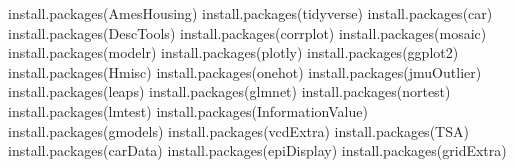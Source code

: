 \documentclass[
  letterpaper,
  DIV=11,
  numbers=noendperiod]{scrreprt}
\newenvironment{Shaded}{\begin{snugshade}}{\end{snugshade}}
\newcommand{\FunctionTok}[1]{\textcolor[rgb]{0.28,0.35,0.67}{#1}}
\newcommand{\NormalTok}[1]{\textcolor[rgb]{0.00,0.23,0.31}{#1}}
\newcommand{\StringTok}[1]{\textcolor[rgb]{0.13,0.47,0.30}{#1}}
\begin{document}
\begin{Shaded}
\begin{Highlighting}[]
\FunctionTok{install.packages}\NormalTok{(}\StringTok{\textquotesingle{}AmesHousing\textquotesingle{}}\NormalTok{)}
\FunctionTok{install.packages}\NormalTok{(}\StringTok{\textquotesingle{}tidyverse\textquotesingle{}}\NormalTok{)}
\FunctionTok{install.packages}\NormalTok{(}\StringTok{\textquotesingle{}car\textquotesingle{}}\NormalTok{)}
\FunctionTok{install.packages}\NormalTok{(}\StringTok{\textquotesingle{}DescTools\textquotesingle{}}\NormalTok{)}
\FunctionTok{install.packages}\NormalTok{(}\StringTok{\textquotesingle{}corrplot\textquotesingle{}}\NormalTok{)}
\FunctionTok{install.packages}\NormalTok{(}\StringTok{\textquotesingle{}mosaic\textquotesingle{}}\NormalTok{)}
\FunctionTok{install.packages}\NormalTok{(}\StringTok{\textquotesingle{}modelr\textquotesingle{}}\NormalTok{)}
\FunctionTok{install.packages}\NormalTok{(}\StringTok{\textquotesingle{}plotly\textquotesingle{}}\NormalTok{)}
\FunctionTok{install.packages}\NormalTok{(}\StringTok{\textquotesingle{}ggplot2\textquotesingle{}}\NormalTok{)}
\FunctionTok{install.packages}\NormalTok{(}\StringTok{\textquotesingle{}Hmisc\textquotesingle{}}\NormalTok{)}
\FunctionTok{install.packages}\NormalTok{(}\StringTok{\textquotesingle{}onehot\textquotesingle{}}\NormalTok{)}
\FunctionTok{install.packages}\NormalTok{(}\StringTok{\textquotesingle{}jmuOutlier\textquotesingle{}}\NormalTok{)}
\FunctionTok{install.packages}\NormalTok{(}\StringTok{\textquotesingle{}leaps\textquotesingle{}}\NormalTok{)}
\FunctionTok{install.packages}\NormalTok{(}\StringTok{\textquotesingle{}glmnet\textquotesingle{}}\NormalTok{)}
\FunctionTok{install.packages}\NormalTok{(}\StringTok{\textquotesingle{}nortest\textquotesingle{}}\NormalTok{)}
\FunctionTok{install.packages}\NormalTok{(}\StringTok{\textquotesingle{}lmtest\textquotesingle{}}\NormalTok{)}
\FunctionTok{install.packages}\NormalTok{(}\StringTok{\textquotesingle{}InformationValue\textquotesingle{}}\NormalTok{)}
\FunctionTok{install.packages}\NormalTok{(}\StringTok{\textquotesingle{}gmodels\textquotesingle{}}\NormalTok{)}
\FunctionTok{install.packages}\NormalTok{(}\StringTok{\textquotesingle{}vcdExtra\textquotesingle{}}\NormalTok{)}
\FunctionTok{install.packages}\NormalTok{(}\StringTok{\textquotesingle{}TSA\textquotesingle{}}\NormalTok{)}
\FunctionTok{install.packages}\NormalTok{(}\StringTok{\textquotesingle{}carData\textquotesingle{}}\NormalTok{)}
\FunctionTok{install.packages}\NormalTok{(}\StringTok{\textquotesingle{}epiDisplay\textquotesingle{}}\NormalTok{)}
\FunctionTok{install.packages}\NormalTok{(}\StringTok{\textquotesingle{}gridExtra\textquotesingle{}}\NormalTok{)}
\end{Highlighting}
\end{Shaded}
\end{document}
